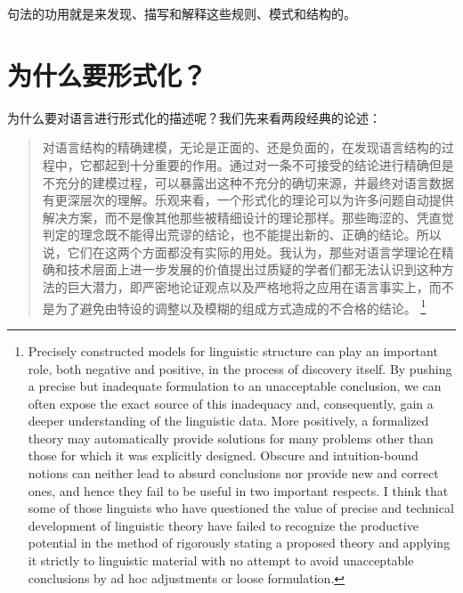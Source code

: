 句法的功用就是来发现、描写和解释这些规则、模式和结构的。

\section{为什么要形式化？}
\label{sec-formal}
\largerpage[2]
为什么要对语言进行形式化的描述呢？我们先来看两段经典的论述：
\begin{quotation}
\label{quote-Chomsky-Formalisierung}%
对语言结构的精确建模，无论是正面的、还是负面的，在发现语言结构的过程中，它都起到十分重要的作用。通过对一条不可接受的结论进行精确但是不充分的建模过程，可以暴露出这种不充分的确切来源，并最终对语言数据有更深层次的理解。乐观来看，一个形式化的理论可以为许多问题自动提供解决方案，而不是像其他那些被精细设计的理论那样。那些晦涩的、凭直觉判定的理念既不能得出荒谬的结论，也不能提出新的、正确的结论。所以说，它们在这两个方面都没有实际的用处。我认为，那些对语言学理论在精确和技术层面上进一步发展的价值提出过质疑的学者们都无法认识到这种方法的巨大潜力，即严密地论证观点以及严格地将之应用在语言事实上，而不是为了避免由特设的调整以及模糊的组成方式造成的不合格的结论。
\citep[]{Chomsky57a}\footnote{%
Precisely constructed models for linguistic structure can play an
important role, both negative and positive, in the process of discovery 
itself. By pushing a precise but inadequate formulation to
an unacceptable conclusion, we can often expose the exact source
of this inadequacy and, consequently, gain a deeper understanding
of the linguistic data. More positively, a formalized theory may 
automatically provide solutions for many problems other than those
for which it was explicitly designed. Obscure and intuition-bound
notions can neither lead to absurd conclusions nor provide new and
correct ones, and hence they fail to be useful in two important respects. 
I think that some of those linguists who have questioned
the value of precise and technical development of linguistic theory
have failed to recognize the productive potential in the method
of rigorously stating a proposed theory and applying it strictly to
linguistic material with no attempt to avoid unacceptable conclusions 
by ad hoc adjustments or loose formulation.}
\end{quotation}

